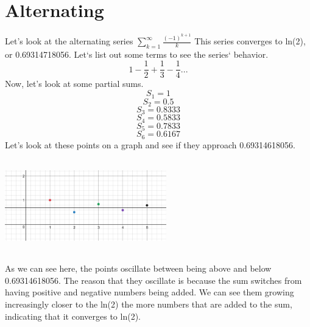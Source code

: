 \documentclass[a4paper,openright, 14pt]{article}
\begin{document}
\section*{Alternating}
Let’s look at the alternating series $\sum\limits_{k=1}^{\infty}\frac{(-1)^{k+1}}{k}$
This series converges to ln(2), or 0.69314718056. Let‘s list out some terms to see the series‘ behavior.
$$1-\frac{1}{2}+\frac{1}{3}-\frac{1}{4}...$$
Now, let’s look at some partial sums.
$$S_1=1$$
$$S_2=0.5$$
$$S_3=0.8333$$
$$S_4=0.5833$$
$$S_5=0.7833$$
$$S_6=0.6167$$
Let’s look at these points on a graph and see if they approach 0.69314618056.
\begin{center}
    \includegraphics[height=4cm, width=7cm]{Images/graph5.png}
\end{center}
As we can see here, the points oscillate between being above and below 0.69314618056. The reason that they oscillate is because the sum switches from having positive and negative numbers being added. We can see them growing increasingly closer to the ln(2) the more numbers that are added to the sum, indicating that it converges to ln(2).
\end{document}

